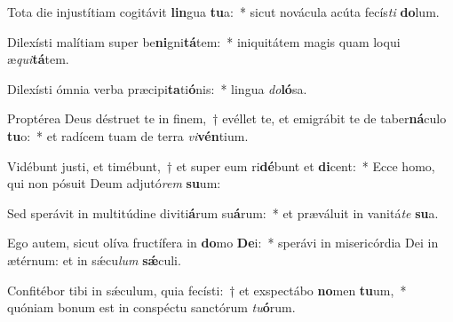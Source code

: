 \item Tota die injustítiam cogitávit \textbf{lin}gua \textbf{tu}a:~* sicut novácula acúta fecís\textit{ti} \textbf{do}lum.
\item Dilexísti malítiam super be\textbf{ni}gni\textbf{tá}tem:~* iniquitátem magis quam loqui æ\textit{qui}\textbf{tá}tem.
\item Dilexísti ómnia verba præcipi\textbf{ta}ti\textbf{ó}nis:~* lingua \textit{do}\textbf{ló}sa.
\item Proptérea Deus déstruet te in finem,~† evéllet te, et emigrábit te de taber\textbf{ná}culo \textbf{tu}o:~* et radícem tuam de terra \textit{vi}\textbf{vén}tium.
\item Vidébunt justi, et timébunt,~† et super eum ri\textbf{dé}bunt et \textbf{di}cent:~* Ecce homo, qui non pósuit Deum adjutó\textit{rem} \textbf{su}um:
\item Sed sperávit in multitúdine diviti\textbf{á}rum su\textbf{á}rum:~* et præváluit in vanitá\textit{te} \textbf{su}a.
\item Ego autem, sicut olíva fructífera in \textbf{do}mo \textbf{De}i:~* sperávi in misericórdia Dei in ætérnum: et in sǽcu\textit{lum} \textbf{sǽ}culi.
\item Confitébor tibi in sǽculum, quia fecísti:~† et exspectábo \textbf{no}men \textbf{tu}um,~* quóniam bonum est in conspéctu sanctórum \textit{tu}\textbf{ó}rum.
